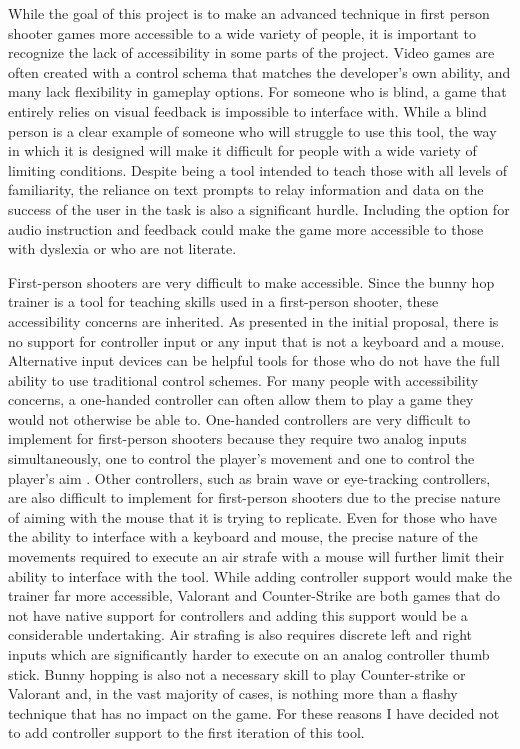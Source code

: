 \documentclass[10pt,twocolumn]{article}
\begin{document}
While the goal of this project is to make an advanced technique in first person shooter games more accessible to a wide variety of people, it is important to recognize the lack of accessibility in some parts of the project. Video games are often created with a control schema that matches the developer's own ability, and many lack flexibility in gameplay options. For someone who is blind, a game that entirely relies on visual feedback is impossible to interface with. While a blind person is a clear example of someone who will struggle to use this tool, the way in which it is designed will make it difficult for people with a wide variety of limiting conditions. Despite being a tool intended to teach those with all levels of familiarity, the reliance on text prompts to relay information and data on the success of the user in the task is also a significant hurdle\cite{AccessInVidya}. Including the option for audio instruction and feedback could make the game more accessible to those with dyslexia or who are not literate. 

First-person shooters are very difficult to make accessible. Since the bunny hop trainer is a tool for teaching skills used in a first-person shooter, these accessibility concerns are inherited. As presented in the initial proposal, there is no support for controller input or any input that is not a keyboard and a mouse. Alternative input devices can be helpful tools for those who do not have the full ability to use traditional control schemes. For many people with accessibility concerns, a one-handed controller can often allow them to play a game they would not otherwise be able to. One-handed controllers are very difficult to implement for first-person shooters because they require two analog inputs simultaneously, one to control the player's movement and one to control the player's aim \cite{GameAccesibilityASurvey}. Other controllers, such as brain wave or eye-tracking controllers, are also difficult to implement for first-person shooters due to the precise nature of aiming with the mouse that it is trying to replicate. Even for those who have the ability to interface with a keyboard and mouse, the precise nature of the movements required to execute an air strafe with a mouse will further limit their ability to interface with the tool. While adding controller support would make the trainer far more accessible, Valorant and Counter-Strike are both games that do not have native support for controllers and adding this support would be a considerable undertaking. Air strafing is also requires discrete left and right inputs which are significantly harder to execute on an analog controller thumb stick. Bunny hopping is also not a necessary skill to play Counter-strike or Valorant and, in the vast majority of cases, is nothing more than a flashy technique that has no impact on the game. For these reasons I have decided not to add controller support to the first iteration of this tool.
\end{document}
